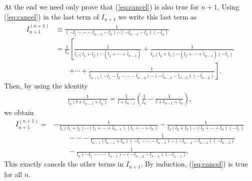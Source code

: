 \documentclass[onecolumn,showpacs,nobibnotes,nofootinbib,12pt,aps,prd,showpacs,notitlepage,nofootinbib,preprintnumbers,amsmath,amssymb]{article}
\begin{document}
At the end we need only prove that (\ref{eq:cancel}) is also true for
$n+1$. Using (\ref{eq:cancel}) in the last term of $I_{n+1}$ we write
this last term as
\begin{align}\label{eq:In1}
  I_{n+1}^{(n+1)}&\equiv \frac{1}{(-l_1-\cdots-l_{n-1}-l_{n})\cdots
    (-l_{n-1}-l_{n})(-l_{n})}%
  \nonumber\\
  &=\frac{1}{l_n}\left[ \frac{1}{l_1(l_1+l_2)\cdots (l_1+\cdots+\tilde l_{n-1})}+\frac{1}{l_2(l_2+l_3)\cdots (l_2+\cdots+\tilde l_{n-1})(-l_1)}\right.\nonumber\\
  &\qquad\left.+\cdots+\frac{1}{\tilde
      l_{n-1}(-l_1-l_2-\cdots-l_{n-2})\cdots
      (-l_{n-3}-l_{n-2})(-l_{n-2})}\right].
\end{align}
Then, by using the identity
\begin{align}
  \frac{1}{l_n(l+l_{n-1}+l_n)}=\frac{1}{l+l_{n-1}}\left(\frac{1}{l_n}-\frac{1}{l+l_{n-1}+l_n}\right),
\end{align}
we obtain
\begin{align}
I_{n+1}^{(n+1)}%
=&-\frac{1}{l_1(l_1+l_2)\cdots (l_1+\cdots+l_{n-1}) (l_1+\cdots+l_{n})}-\frac{1}{l_2(l_2+l_3)\cdots (l_2+\cdots+l_{n})(-l_1)}\nonumber\\
&\qquad-\cdots-\frac{1}{ l_{n-1}(l_{n-1}+l_{n})(-l_1-\cdots-l_{n-2})\cdots (-l_{n-3}-l_{n-2})(-l_{n-2})}\nonumber\\
&\qquad-\frac{1}{ l_{n}(-l_1-\cdots-l_{n-1})\cdots (-l_{n-2}-l_{n-1})(-l_{n-1})}.
\end{align}
This exactly cancels the other terms in $I_{n+1}$. By induction,
(\ref{eq:cancel}) is true for all $n$.
\end{document}
